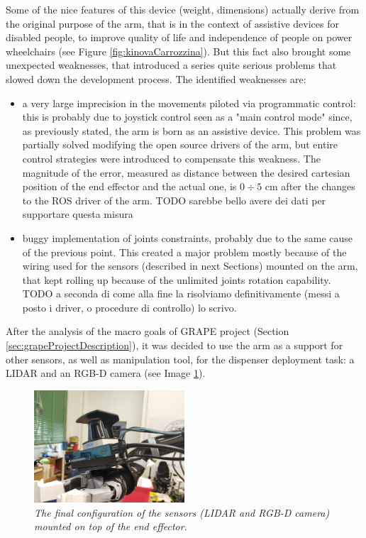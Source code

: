  Some of the nice features of this device (weight, dimensions) actually derive from the original purpose of the arm, that is in the context of assistive devices for disabled people, to improve quality of life and independence of people on  power wheelchairs (see Figure \ref{fig:kinovaCarrozzina}). But this fact also brought some unexpected weaknesses, that introduced a series quite serious problems that slowed down the development process. The identified weaknesses are:
 \begin{itemize}
 	\item a very large imprecision in the movements piloted via programmatic control: this is probably due to joystick control seen as a "main control mode" since, as previously stated, the arm is born as an assistive device. This problem was partially solved modifying the open source drivers of the arm, but entire control strategies were introduced to compensate this weakness. The magnitude of the error, measured as distance between the desired cartesian position of the end effector and the actual one, is $0\div5$ cm after the changes to the \ac{ROS} driver of the arm. TODO sarebbe bello avere dei dati per supportare questa misura
 	\item buggy implementation of joints constraints, probably due to the same cause of the previous point. This created a major problem mostly because of the wiring used for the sensors (described in next Sections) mounted on the arm, that kept rolling up because of the unlimited joints rotation capability. TODO a seconda di come alla fine la risolviamo definitivamente (messi a posto i driver, o procedure di controllo) lo scrivo.
 \end{itemize}
 
After the analysis of the macro goals of \ac{GRAPE} project (Section \ref{sec:grapeProjectDescription}), it was decided to use the arm as a support for other sensors, as well as manipulation tool, for the dispenser deployment task: a \ac{LIDAR} and an RGB-D camera (see Image \ref{fig:sensoriEndEffector}).
  
 \begin{figure}
	\centering
	\includegraphics[width=0.5\textwidth]{Images/grape_sw_hw_architecture/sensoriEndEffector.jpg}
	\caption{\textit{The final configuration of the sensors (\ac{LIDAR} and RGB-D camera) mounted on top of the end effector.}}
	\label{fig:sensoriEndEffector}
\end{figure}

